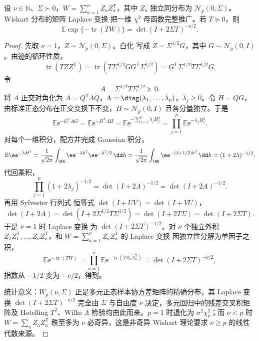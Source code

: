 \begin{proposition}
设 $\nu\in\mathbb N$、$\Sigma\succ0$，$W=\sum_{a=1}^\nu Z_aZ_a^{\mathsf T}$，其中 $Z_a$ 独立同分布为 $\mathcal N_p(0,\Sigma)$。
Wishart 分布的矩阵 Laplace 变换 把一维 $\chi^2$ 母函数完整推广。若 $T\succeq0$，则
\begin{equation}
\mathbb E\exp\{-\operatorname{tr}(TW)\}
=
\det(I+2\Sigma T)^{-\nu/2}.
\label{eq:math-stat-wishart-laplace}
\end{equation}
\end{proposition}
\begin{proof}
先取 $\nu=1$，$Z\sim\mathcal N_p(0,\Sigma)$。白化 写成 $Z=\Sigma^{1/2}G$，其中 $G\sim\mathcal N_p(0,I)$。由迹的循环性质，
\[
\operatorname{tr}(TZZ^{\mathsf T})
=\operatorname{tr}(T\Sigma^{1/2}GG^{\mathsf T}\Sigma^{1/2})
=G^{\mathsf T}\Sigma^{1/2}T\Sigma^{1/2}G.
\]
令
\[
A=\Sigma^{1/2}T\Sigma^{1/2}\succeq0.
\]
将 $A$ 正交对角化为 $A=Q^{\mathsf T}\Lambda Q$，$\Lambda=\diag(\lambda_1,\ldots,\lambda_p)$，$\lambda_j\ge0$。令 $H=QG$，由标准正态分布在正交变换下不变，$H\sim\mathcal N_p(0,I)$ 且各分量独立。于是
\[
\mathbb E\ee^{-G^{\mathsf T}AG}
=\mathbb E\ee^{-H^{\mathsf T}\Lambda H}
=\mathbb E\ee^{-\sum_{j=1}^p\lambda_jH_j^2}
=\prod_{j=1}^p\mathbb E\ee^{-\lambda_jH_j^2}.
\]
对每个一维积分，配方并完成 Gaussian 积分，
\[
\mathbb E\ee^{-\lambda H^2}
=\frac1{\sqrt{2\pi}}\int_\RR\ee^{-\lambda h^2}\ee^{-h^2/2}\,\dd h
=\frac1{\sqrt{2\pi}}\int_\RR\ee^{-(\lambda+1/2)h^2}\,\dd h
=(1+2\lambda)^{-1/2}.
\]
代回乘积，
\[
\prod_{j=1}^p(1+2\lambda_j)^{-1/2}
=\det(I+2\Lambda)^{-1/2}
=\det(I+2A)^{-1/2}.
\]
再用 Sylvester 行列式 恒等式 $\det(I+UV)=\det(I+VU)$，
\[
\det(I+2A)
=\det(I+2\Sigma^{1/2}T\Sigma^{1/2})
=\det(I+2T\Sigma)
=\det(I+2\Sigma T).
\]
于是 $\nu=1$ 时 Laplace 变换 为 $\det(I+2\Sigma T)^{-1/2}$。对 $\nu$ 个独立外积 $Z_1Z_1^{\mathsf T},\ldots,Z_\nu Z_\nu^{\mathsf T}$，和 $W=\sum_{a=1}^\nu Z_aZ_a^{\mathsf T}$ 的 Laplace 变换 因独立性分解为单因子之积，
\[
\mathbb E\ee^{-\operatorname{tr}(TW)}
=\prod_{a=1}^\nu\mathbb E\ee^{-\operatorname{tr}(TZ_aZ_a^{\mathsf T})}
=\det(I+2\Sigma T)^{-\nu/2},
\]
指数从 $-1/2$ 变为 $-\nu/2$，得到。

统计意义：$W_p(\nu,\Sigma)$ 正是多元正态样本协方差矩阵的精确分布，其 Laplace 变换 $\det(I+2\Sigma T)^{-\nu/2}$ 完全由 $\Sigma$ 与自由度 $\nu$ 决定，多元回归中的残差交叉积矩阵及 Hotelling $T^2$、Wilks $\Lambda$ 检验均由此而来。$p=1$ 时退化为 $\sigma^2\chi^2_\nu$；而 $\nu<p$ 时 $W=\sum_aZ_aZ_a^{\mathsf T}$ 秩至多为 $\nu$ 必奇异，这是非奇异 Wishart 理论要求 $\nu\ge p$ 的线性代数来源。
\end{proof}

